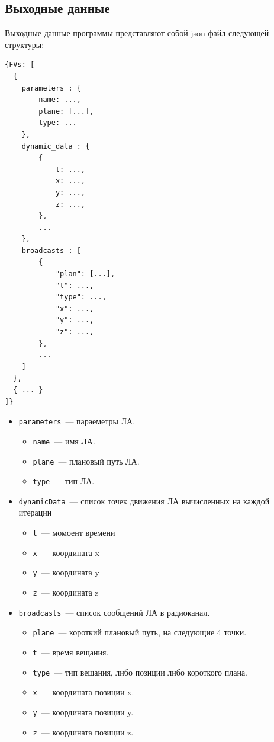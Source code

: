 \documentclass[a4paper,12pt]{article}
\numberwithin{figure}{subsubsection}
\begin{document}
\subsection{Выходные данные}
Выходные данные программы представляют собой json файл следующей структуры:
\begin{verbatim}
{FVs: [
  {
    parameters : { 
        name: ...,
        plane: [...],
        type: ...
    },
    dynamic_data : { 
        {
            t: ...,
            x: ...,
            y: ...,
            z: ...,
        },
        ...
    },
    broadcasts : [
        {
            "plan": [...],
            "t": ...,
            "type": ...,
            "x": ...,
            "y": ...,
            "z": ...,
        },
        ...
    ]
  },
  { ... }
]}
\end{verbatim}
\begin{itemize}
    \item \texttt{parameters}~--- параеметры ЛА.
    \begin{itemize}
            \item  \texttt{name}~--- имя ЛА.
            \item  \texttt{plane}~--- плановый путь ЛА.
            \item  \texttt{type}~--- тип ЛА.
    \end{itemize}
    \item \texttt{dynamicData}~--- список точек движения ЛА вычисленных на каждой итерации
    \begin{itemize}
            \item \texttt{t}~--- момоент времени
            \item \texttt{x}~--- координата x
            \item \texttt{y}~--- координата y
            \item\texttt{z}~--- координата z
    \end{itemize}
    \item \texttt{broadcasts}~--- список сообщений ЛА в радиоканал.
    \begin{itemize}
            \item  \texttt{plane}~--- короткий плановый путь, на следующие 4 точки.
            \item  \texttt{t}~--- время вещания.
            \item  \texttt{type}~--- тип вещания, либо позиции либо короткого плана.
            \item  \texttt{x}~--- координата позиции x.
            \item  \texttt{y}~--- координата позиции y.
            \item  \texttt{z}~--- координата позиции z.
    \end{itemize}
\end{itemize}
\end{document}

